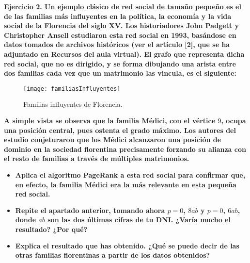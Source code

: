 
\begin{ejer}
    \textbf{Ejercicio 2. Un ejemplo clásico de red social de tamaño pequeño es el de las familias 
    más influyentes en la política, la economía y la vida social de la Florencia del siglo XV. 
    Los historiadores John Padgett y Christopher Ansell estudiaron esta red social en 1993, 
    basándose en datos tomados de archivos históricos (ver el artículo [2], que se ha adjuntado en 
    Recursos del aula virtual). El grafo que representa dicha red social, que no es dirigido, 
    y se forma dibujando una arista entre dos familias cada vez que un matrimonio las vincula, es el siguiente:}
\end{ejer}
 \begin{figure}[H]
	\texttt{[image: familiasInfluyentes]}
	\centering
	\caption{Familias influyentes de Florencia.}
    \label{fig:familiasInfluyentes}
\end{figure}
\begin{ejer}
    \textbf{A simple vista se observa que la familia Médici, con el vértice $9$, ocupa una posición central, pues ostenta el grado máximo. 
    Los autores del estudio conjeturaron que los Médici alcanzaron una posición de dominio en la sociedad florentina precisamente forzando 
    su alianza con el resto de familias a través de múltiples matrimonios.}
\end{ejer}
\begin{ejer}
    \begin{itemize}
        \item \textbf{Aplica el algoritmo PageRank a esta red social para confirmar que, en efecto, la familia Médici era la más relevante en esta pequeña red social.}
    \end{itemize}
\end{ejer}

\begin{ejer}
    \begin{itemize}
        \item \textbf{Repite el apartado anterior, tomando ahora $p = 0$, $8ab$ y $p = 0$, $6ab$, donde $ab$ son las dos últimas cifras de tu DNI. ¿Varía mucho el resultado? ¿Por qué?}
    \end{itemize}
\end{ejer}

\begin{ejer}
    \begin{itemize}
        \item \textbf{Explica el resultado que has obtenido. ¿Qué se puede decir de las otras familias florentinas a partir de los datos obtenidos?}
    \end{itemize}
\end{ejer}
